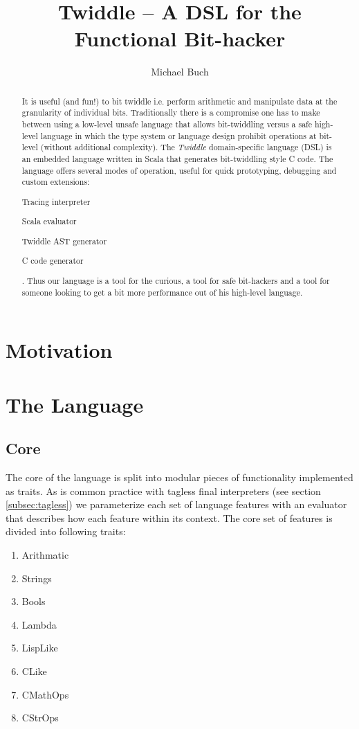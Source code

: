 \documentclass{article}
\title{Twiddle -- A DSL for the Functional Bit-hacker}
\author{Michael Buch}
\begin{document}
\maketitle
\frenchspacing

\begin{abstract}
It is useful (and fun!) to bit twiddle i.e. perform arithmetic and manipulate data at the granularity of individual bits. Traditionally there is a compromise one has to make between using a low-level unsafe language that allows bit-twiddling versus a safe high-level language in which the type system or language design prohibit operations at bit-level (without additional complexity). The \textit{Twiddle} domain-specific language (DSL) is an embedded language written in Scala that generates bit-twiddling style C code. The language offers several modes of operation, useful for quick prototyping, debugging and custom extensions:
\begin{enumerate*}[label=(\arabic*)]
	\item Tracing interpreter
	\item Scala evaluator
	\item Twiddle AST generator
	\item C code generator
\end{enumerate*}.
Thus our language is a tool for the curious, a tool for safe bit-hackers and a tool for someone looking to get a bit more performance out of his high-level language.
\end{abstract}

\section{Motivation}
\section{The Language}
\subsection{Core}
The core of the language is split into modular pieces of functionality implemented as traits. As is common practice with tagless final interpreters (see section \ref{subsec:tagless}) we parameterize each set of language features with an evaluator that describes how each feature within its context. The core set of features is divided into following traits:
\begin{enumerate}
	\item Arithmatic
	\item Strings
	\item Bools
	\item Lambda
	\item LispLike
	\item CLike
	\item CMathOps
	\item CStrOps
\end{enumerate}
\end{document}
